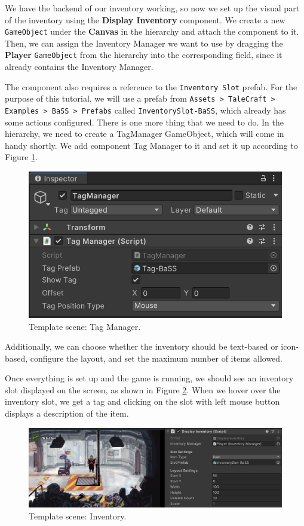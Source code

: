 We have the backend of our inventory working, so now we set up the visual part of the inventory using the \textbf{Display Inventory} component. We create a new \verb|GameObject| under the \textbf{Canvas} in the hierarchy and attach the component to it. Then, we can assign the Inventory Manager we want to use by dragging the \textbf{Player} \verb|GameObject| from the hierarchy into the corresponding field, since it already contains the Inventory Manager.

The component also requires a reference to the \texttt{Inventory Slot} prefab. For the purpose of this tutorial, we will use a prefab from \texttt{Assets > TaleCraft > Examples > BaSS > Prefabs} called \texttt{InventorySlot-BaSS}, which already has some actions configured. There is one more thing that we need to do. In the hierarchy, we need to create a TagManager GameObject, which will come in handy shortly. We add component Tag Manager to it and set it up according to Figure \ref{fig:Tutorial-template:TM}. 

\begin{figure}[H]
\centering
\includegraphics[width=0.6\linewidth]{img/User doc/image_2025-07-09_135233837.png}
\caption{Template scene: Tag Manager.}
\label{fig:Tutorial-template:TM}
\end{figure}

Additionally, we can choose whether the inventory should be text-based or icon-based, configure the layout, and set the maximum number of items allowed.

Once everything is set up and the game is running, we should see an inventory slot displayed on the screen, as shown in Figure \ref{fig:Tutorial-template:Inv}. When we hover over the inventory slot, we get a tag and clicking on the slot with left mouse button displays a description of the item.

\begin{figure}[H]
\centering
\includegraphics[width=1\linewidth]{img/User doc/image_2025-07-09_135900005.png}
\caption{Template scene: Inventory.}
\label{fig:Tutorial-template:Inv}
\end{figure}

